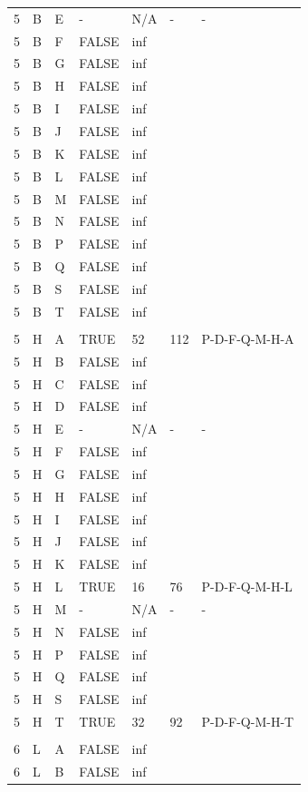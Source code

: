 \documentclass[11pt]{book}
\renewcommand{\=}[1]{\stackrel{#1}{=}} %
\theoremstyle{definition}
\theoremstyle{remark}
\begin{document}
\begin{longtable}{lllllll}
5 & B & E & - & N/A & - & - \\
5 & B & F & FALSE & inf &  &  \\
5 & B & G & FALSE & inf &  &  \\
5 & B & H & FALSE & inf &  &  \\
5 & B & I & FALSE & inf &  &  \\
5 & B & J & FALSE & inf &  &  \\
5 & B & K & FALSE & inf &  &  \\
5 & B & L & FALSE & inf &  &  \\
5 & B & M & FALSE & inf &  &  \\
5 & B & N & FALSE & inf &  &  \\
5 & B & P & FALSE & inf &  &  \\
5 & B & Q & FALSE & inf &  &  \\
5 & B & S & FALSE & inf &  &  \\
5 & B & T & FALSE & inf &  &  \\
 &  &  &  &  &  &  \\
5 & H & A & TRUE & 52 & 112 & P-D-F-Q-M-H-A \\
5 & H & B & FALSE & inf &  &  \\
5 & H & C & FALSE & inf &  &  \\
5 & H & D & FALSE & inf &  &  \\
5 & H & E & - & N/A & - & - \\
5 & H & F & FALSE & inf &  &  \\
5 & H & G & FALSE & inf &  &  \\
5 & H & H & FALSE & inf &  &  \\
5 & H & I & FALSE & inf &  &  \\
5 & H & J & FALSE & inf &  &  \\
5 & H & K & FALSE & inf &  &  \\
5 & H & L & TRUE & 16 & 76 & P-D-F-Q-M-H-L \\
5 & H & M & - & N/A & - & - \\
5 & H & N & FALSE & inf &  &  \\
5 & H & P & FALSE & inf &  &  \\
5 & H & Q & FALSE & inf &  &  \\
5 & H & S & FALSE & inf &  &  \\
5 & H & T & TRUE & 32 & 92 & P-D-F-Q-M-H-T \\
 &  &  &  &  &  &  \\
6 & L & A & FALSE & inf &  &  \\
6 & L & B & FALSE & inf &  &  \\

\end{longtable}
\end{document}
